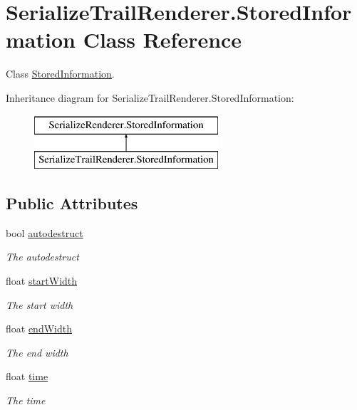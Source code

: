 \hypertarget{class_serialize_trail_renderer_1_1_stored_information}{}\section{Serialize\+Trail\+Renderer.\+Stored\+Information Class Reference}
\label{class_serialize_trail_renderer_1_1_stored_information}


Class \hyperlink{class_serialize_trail_renderer_1_1_stored_information}{Stored\+Information}.  


Inheritance diagram for Serialize\+Trail\+Renderer.\+Stored\+Information\+:\begin{figure}[H]
\begin{center}
\leavevmode
\includegraphics[height=2.000000cm]{class_serialize_trail_renderer_1_1_stored_information}
\end{center}
\end{figure}
\subsection*{Public Attributes}
\begin{DoxyCompactItemize}
\item 
bool \hyperlink{class_serialize_trail_renderer_1_1_stored_information_a65132d2d7d455bef7e5eef0fe5841383}{autodestruct}
\begin{DoxyCompactList}\small\item\em The autodestruct \end{DoxyCompactList}\item 
float \hyperlink{class_serialize_trail_renderer_1_1_stored_information_a5e5883660f47fc7d05d1cda7341d74b5}{start\+Width}
\begin{DoxyCompactList}\small\item\em The start width \end{DoxyCompactList}\item 
float \hyperlink{class_serialize_trail_renderer_1_1_stored_information_a3d74995a22c93639e0b74b7e26f5defa}{end\+Width}
\begin{DoxyCompactList}\small\item\em The end width \end{DoxyCompactList}\item 
float \hyperlink{class_serialize_trail_renderer_1_1_stored_information_a1f83c23bd946bef81b12cd1d46faed05}{time}
\begin{DoxyCompactList}\small\item\em The time \end{DoxyCompactList}\end{DoxyCompactItemize}


